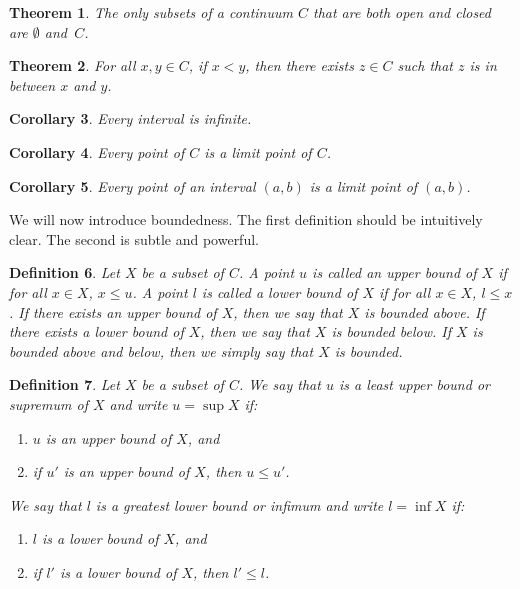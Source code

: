 \documentclass{amsart}
\newtheorem{theorem}{Theorem}
\newtheorem{definition}[theorem]{Definition}
\newtheorem{corollary}[theorem]{Corollary}
\newcommand{\1}{\mathds{1}}
\numberwithin{equation}{section}
\numberwithin{theorem}{section}
\begin{document}
\begin{theorem}
The only subsets of a continuum $C$ that are both open and closed are $\emptyset$ and~$C$.
\end{theorem}

\begin{theorem}
For all $x, y \in C$, if $x < y$, then there exists $z \in C$ such that $z$ is in between $x$ and $y$.
\end{theorem}

\begin{corollary}
Every interval is infinite.
\end{corollary}

\begin{corollary}  Every point of $C$ is a limit point of $C$.  
\end{corollary}

\begin{corollary} 
Every point of an interval $(a,b)$ is a limit point of $(a,b)$.
\end{corollary}




We will now introduce boundedness.   The first definition should be intuitively clear.  The second is subtle and powerful.  


\begin{definition}  Let $X$ be a subset of $C$.  A point $u$ is called an \emph{upper bound} of $X$ if for all $x \in X$, $x \leq u$.  A point $l$ is called a \emph{lower bound} of $X$ if for all $x \in X$, $l \leq x$.  If there exists an upper bound of $X$, then we say that $X$ is \emph{bounded above}.  If there exists a lower bound of $X$, then we say that $X$ is \emph{bounded below}.  If $X$ is bounded above and below, then we simply say that $X$ is \emph{bounded}.
\end{definition}


\begin{definition}  Let $X$ be a subset of $C$.  We say that $u$ is a \emph{least upper bound} or {\em supremum} of $X$ and write $u = \sup X$ if:
\begin{enumerate}
\item  $u$ is an upper bound of $X$, and
\item  if $u'$ is an upper bound of $X$, then $u \leq u'$.
\end{enumerate}
We say that $l$ is a \emph{greatest lower bound} or {\em infimum} and write $l = \inf X$ if:
\begin{enumerate}
\item $l$ is a lower bound of $X$, and
\item if $l'$ is a lower bound of $X$, then $l' \leq l$.
\end{enumerate}
\end{definition}
\end{document}
